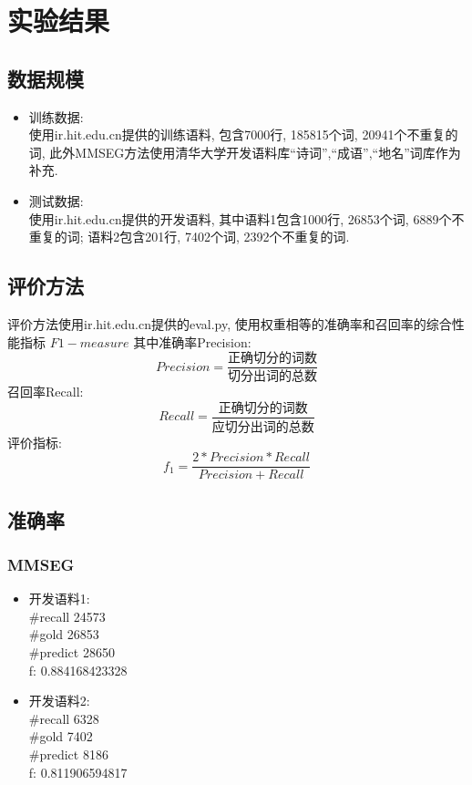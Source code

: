 \documentclass[titlepage]{article}
\begin{document}
\section{实验结果}
\subsection{数据规模}
\begin{itemize}
    \item 训练数据:\\[1em]
        使用ir.hit.edu.cn提供的训练语料, 包含7000行, 185815个词, 20941个不重复的词, 此外MMSEG方法使用清华大学开发语料库``诗词'',``成语'',``地名''词库作为补充.\\
    \item 测试数据:\\[1em]
        使用ir.hit.edu.cn提供的开发语料, 其中语料1包含1000行, 26853个词, 6889个不重复的词; 语料2包含201行, 7402个词, 2392个不重复的词.
\end{itemize}
\subsection{评价方法}
评价方法使用ir.hit.edu.cn提供的eval.py, 使用权重相等的准确率和召回率的综合性能指标 $F1-measure$
其中准确率Precision:
$$
Precision = \frac{\texttt{正确切分的词数}}{\texttt{切分出词的总数}}
$$
召回率Recall:
$$
Recall = \frac{\texttt{正确切分的词数}}{\texttt{应切分出词的总数}}
$$
评价指标:
$$
f_1 = \frac{2 * Precision * Recall}{Precision + Recall}
$$
\subsection{准确率}
\subsubsection{MMSEG}
\begin{itemize}
    \item 开发语料1:\\[1em]
        \#recall 24573\\
        \#gold 26853\\
        \#predict 28650\\
        f: 0.884168423328
    \item 开发语料2:\\[1em]
        \#recall 6328\\
        \#gold 7402\\
        \#predict 8186\\
        f: 0.811906594817
\end{itemize}
\end{document}
